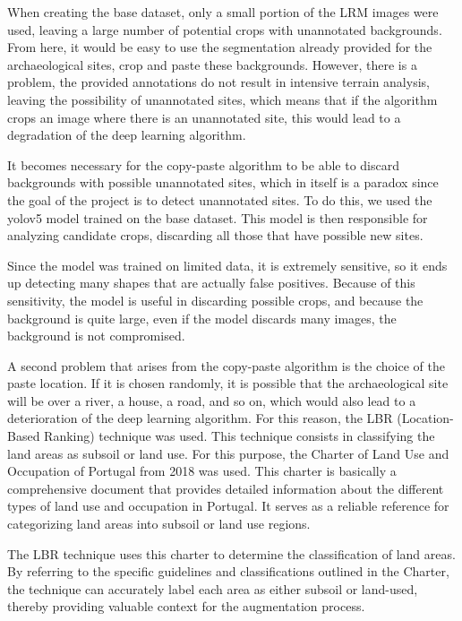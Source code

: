 When creating the base dataset, only a small portion of the LRM images were used, leaving a large number of potential crops with unannotated backgrounds. From here, it would be easy to use the segmentation already provided for the archaeological sites, crop and paste these backgrounds. However, there is a problem, the provided annotations do not result in intensive terrain analysis, leaving the possibility of unannotated sites, which means that if the algorithm crops an image where there is an unannotated site, this would lead to a degradation of the deep learning algorithm.

It becomes necessary for the copy-paste algorithm to be able to discard backgrounds with possible unannotated sites, which in itself is a paradox since the goal of the project is to detect unannotated sites. To do this, we used the yolov5 model trained on the base dataset. This model is then responsible for analyzing candidate crops, discarding all those that have possible new sites. 

Since the model was trained on limited data, it is extremely sensitive, so it ends up detecting many shapes that are actually false positives. Because of this sensitivity, the model is useful in discarding possible crops, and because the background is quite large, even if the model discards many images, the background is not compromised.

A second problem that arises from the copy-paste algorithm is the choice of the paste location. If it is chosen randomly, it is possible that the archaeological site will be over a river, a house, a road, and so on, which would also lead to a deterioration of the deep learning algorithm. For this reason, the LBR (Location-Based Ranking) technique was used. This technique consists in classifying the land areas as subsoil or land use. For this purpose, the Charter of Land Use and Occupation of Portugal from 2018\cite{charterPortugal} was used. This charter is basically a comprehensive document that provides detailed information about the different types of land use and occupation in Portugal. It serves as a reliable reference for categorizing land areas into subsoil or land use regions.

The LBR technique uses this charter to determine the classification of land areas. By referring to the specific guidelines and classifications outlined in the Charter, the technique can accurately label each area as either subsoil or land-used, thereby providing valuable context for the augmentation process.


